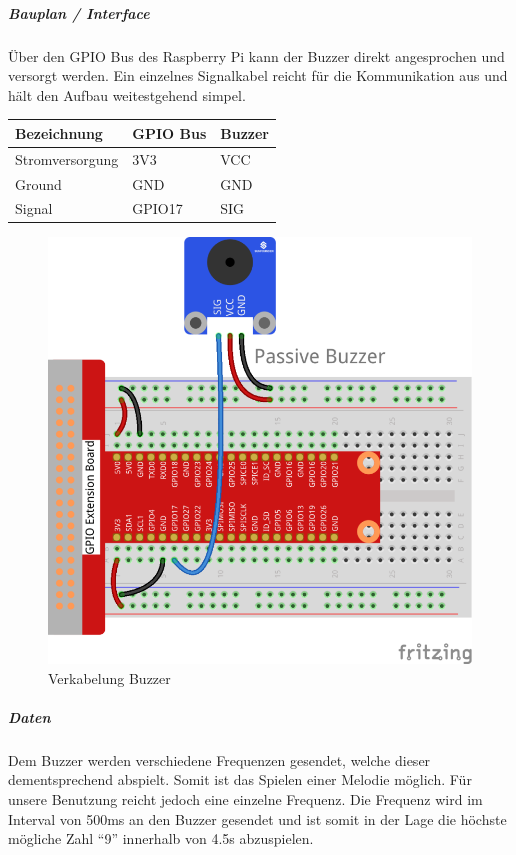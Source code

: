 \documentclass[../../main.tex]{subfiles}
\begin{document}
\subparagraph{Bauplan / Interface}

Über den GPIO Bus des Raspberry Pi kann der Buzzer direkt angesprochen und versorgt werden. Ein einzelnes Signalkabel reicht für die Kommunikation aus und hält den Aufbau weitestgehend simpel.

\begin{table}[H]
\begin{flushleft}
\begin{tabular}{lll}
\hline
Bezeichnung     & GPIO Bus & Buzzer \\ \hline
Stromversorgung & 3V3      & VCC    \\ \hline
Ground          & GND      & GND    \\ \hline
Signal          & GPIO17   & SIG    \\ \hline
\end{tabular}
\end{flushleft}
\end{table}

\begin{figure}[H] \centering
  \includegraphics{VerkabelungAkustik}
  \caption{Verkabelung Buzzer}
  \label{fig:Buzzer}
\end{figure}

\subparagraph{Daten}
Dem Buzzer werden verschiedene Frequenzen gesendet, welche dieser dementsprechend abspielt. Somit ist das Spielen einer Melodie möglich. Für unsere Benutzung reicht jedoch eine einzelne Frequenz. Die Frequenz wird im Interval von 500ms an den Buzzer gesendet und ist somit in der Lage die höchste mögliche Zahl ``9'' innerhalb von 4.5s abzuspielen.
\end{document}
